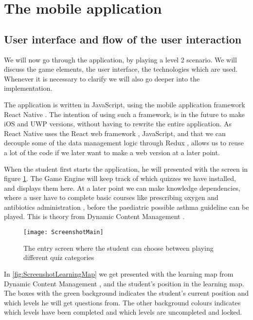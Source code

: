 \section{The mobile application}
\subsection{User interface and flow of the user interaction}

We will now go through the application, by playing a level 2 scenario. We will discuss the game elements, the user interface, the technologies which are used. Whenever it is necessary to clarify we will also go deeper into the implementation.

The application is written in JavaScript, using the mobile application framework React Native \parencite{ReactNative}. The intention of using such a framework, is in the future to make iOS and UWP versions, without having to rewrite the entire application. As React Native uses the React web framework \parencite{React}, JavaScript, and that we can decouple some of the data management logic through Redux \parencite{Redux}, allows us to reuse a lot of the code if we later want to make a web version at a later point.

When the student first starts the application, he will presented with the screen in figure \ref{fig:ScreenshotMain}. The Game Engine will keep track of which quizzes we have installed, and displays them here. At a later point we can make knowledge dependencies, where a user have to complete basic courses like prescribing oxygen \parencite{RepublicofKeny2016} and antibiotics administration \parencite{RepublicofKeny2016}, before the paediatric possible asthma guideline \parencite{RepublicofKeny2016} can be played. This is theory from Dynamic Content Management \parencite{Eide2008}.

\begin{figure}[h!]
	\texttt{[image: ScreenshotMain]}
	\caption {The entry screen where the student can choose between playing different quiz categories}
	\label{fig:ScreenshotMain}
\end{figure}

In \ref{fig:ScreenshotLearningMap} we get presented with the learning map from Dynamic Content Management \parencite{Eide2008}, and the student's position in the learning map. The boxes with the green background indicates the student's current position and which levels he will get questions from. The other background colours indicates which levels have been completed and which levels are uncompleted and locked. 

